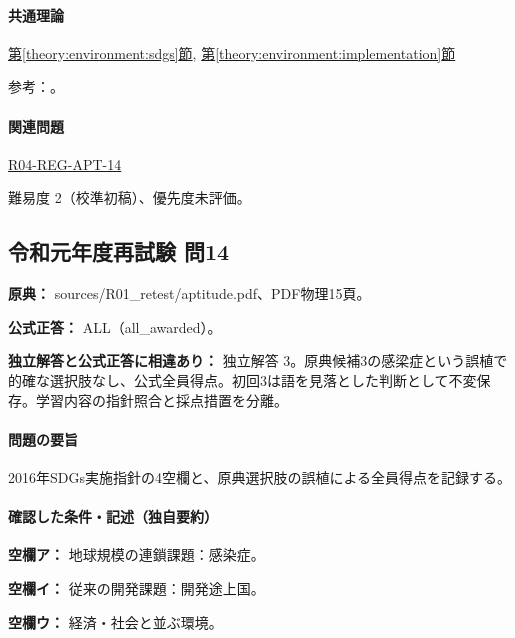 \paragraph{共通理論} \hyperref[theory:environment:sdgs]{第\ref*{theory:environment:sdgs}節}, \hyperref[theory:environment:implementation]{第\ref*{theory:environment:implementation}節}

\par 参考：\cite{env_sdgs_agenda,env_sdgs2016,env_sdgs_un}。

\paragraph{関連問題} \hyperref[q:r04-reg-apt-14]{R04-REG-APT-14}

\par 難易度 2（校準初稿）、優先度未評価。

\subsection{令和元年度再試験 問14}
\label{q:r01-ret-apt-14}

\noindent\textbf{原典：} sources/R01\_retest/aptitude.pdf、PDF物理15頁。

\textbf{公式正答：} ALL（all\_awarded）。

\par\textbf{独立解答と公式正答に相違あり：} 独立解答 3。原典候補3の感梁症という誤植で的確な選択肢なし、公式全員得点。初回3は語を見落とした判断として不変保存。学習内容の指針照合と採点措置を分離。

\paragraph{問題の要旨} 2016年SDGs実施指針の4空欄と、原典選択肢の誤植による全員得点を記録する。

\paragraph{確認した条件・記述（独自要約）}\mbox{}\par

\noindent\textbf{空欄ア：} 地球規模の連鎖課題：感染症。\par

\noindent\textbf{空欄イ：} 従来の開発課題：開発途上国。\par

\noindent\textbf{空欄ウ：} 経済・社会と並ぶ環境。\par

